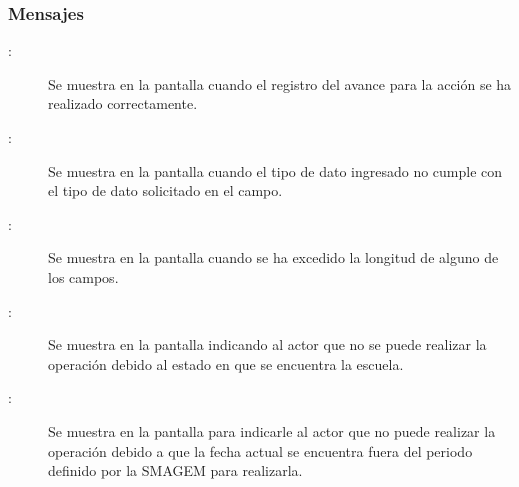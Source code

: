 \subsubsection{Mensajes}

    \begin{description}
    
	    \item [:] Se muestra en la pantalla  cuando el registro del avance para la acción se ha realizado correctamente.
	    
	    \item [:] Se muestra en la pantalla  cuando el tipo de dato ingresado no cumple con el tipo de dato solicitado en el campo.
	    
	    \item [:] Se muestra en la pantalla  cuando se ha excedido la longitud de alguno de los campos.	
	    
	    \item [:] Se muestra en la pantalla  indicando al actor que no se puede realizar la operación debido al estado en que se encuentra la escuela.
	    
	    \item [:] Se muestra en la pantalla  para indicarle al actor que no puede realizar la operación debido a que la fecha actual se encuentra fuera del periodo definido por la SMAGEM para realizarla.
    \end{description}

